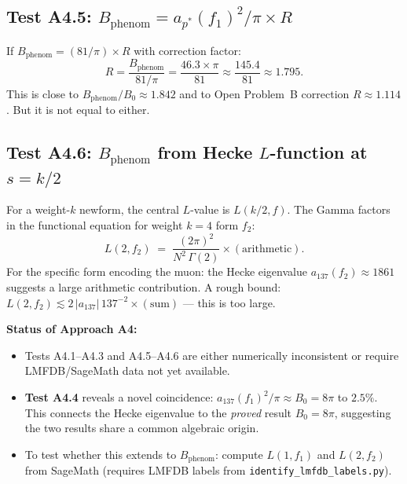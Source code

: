 \documentclass[12pt,a4paper]{article}
\theoremstyle{definition}
\theoremstyle{remark}
\begin{document}
\subsection{Test A4.5: $B_{\mathrm{phenom}} = a_{p^*}(f_1)^2 / \pi \times R$}

If $B_{\mathrm{phenom}} = (81/\pi) \times R$ with correction factor:
\[
  R = \frac{B_{\mathrm{phenom}}}{81/\pi}
    = \frac{46.3 \times \pi}{81}
    \approx \frac{145.4}{81}
    \approx 1.795.
\]
This is close to $B_{\mathrm{phenom}}/B_0 \approx 1.842$ and to Open
Problem~B correction $R \approx 1.114$.  But it is not equal to either.

\subsection{Test A4.6: $B_{\mathrm{phenom}}$ from Hecke $L$-function at $s = k/2$}

For a weight-$k$ newform, the central $L$-value is $L(k/2, f)$.  The
Gamma factors in the functional equation for weight $k = 4$ form $f_2$:
\begin{equation}
  L(2, f_2) \;=\; \frac{(2\pi)^2}{N^2\,\Gamma(2)} \times (\text{arithmetic}).
\end{equation}
For the specific form encoding the muon: the Hecke eigenvalue
$a_{137}(f_2) \approx 1861$ suggests a large arithmetic contribution.
A rough bound: $L(2, f_2) \lesssim 2\,|a_{137}|\,137^{-2} \times (\text{sum})$
--- this is too large.

\begin{gapbox}
\textbf{Status of Approach A4:}
\begin{itemize}
  \item Tests A4.1--A4.3 and A4.5--A4.6 are either numerically
        inconsistent or require LMFDB/SageMath data not yet available.
  \item \textbf{Test A4.4} reveals a novel coincidence:
        $a_{137}(f_1)^2/\pi \approx B_0 = 8\pi$ to $2.5\%$.
        This connects the Hecke eigenvalue to the \emph{proved}
        result $B_0 = 8\pi$, suggesting the two results share
        a common algebraic origin.
  \item To test whether this extends to $B_{\mathrm{phenom}}$:
        compute $L(1, f_1)$ and $L(2, f_2)$ from SageMath
        (requires LMFDB labels from \texttt{identify\_lmfdb\_labels.py}).
\end{itemize}
\end{gapbox}

\end{document}
